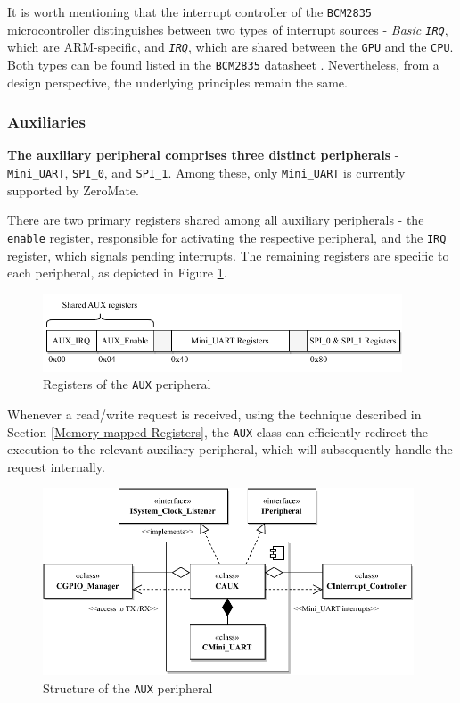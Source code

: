 \documentclass[english, ing, kiv, he, iso690numb, pdf]{fasthesis}
\begin{document}
	It is worth mentioning that the interrupt controller of the \texttt{BCM2835} microcontroller distinguishes between two types of interrupt sources - \textit{Basic \texttt{IRQ}}, which are ARM-specific, and \textit{\texttt{IRQ}}, which are shared between the \texttt{GPU} and the \texttt{CPU}. Both types can be found listed in the \texttt{BCM2835} datasheet \cite{BCM2835}. Nevertheless, from a design perspective, the underlying principles remain the same.
	
	\subsubsection{Auxiliaries} \label{AUX}
	
	\textbf{The auxiliary peripheral comprises three distinct peripherals} - \texttt{Mini\_UART}, \texttt{SPI\_0}, and \texttt{SPI\_1}. Among these, only \texttt{Mini\_UART} is currently supported by ZeroMate.
	
	There are two primary registers shared among all auxiliary peripherals - the \texttt{enable} register, responsible for activating the respective peripheral, and the \texttt{IRQ} register, which signals pending interrupts. The remaining registers are specific to each peripheral, as depicted in Figure \ref{Registers of the AUX peripheral}.
	
	\begin{figure}[ht]
		\centering
		\includegraphics[width=0.95\textwidth]{img/diagrams/aux_reg.pdf}
		\caption{Registers of the \texttt{AUX} peripheral}
		\label{Registers of the AUX peripheral}
	\end{figure}
	
	Whenever a read/write request is received, using the technique described in Section \ref{Memory-mapped Registers}, the \texttt{AUX} class can efficiently redirect the execution to the relevant auxiliary peripheral, which will subsequently handle the request internally.
	
	\newpage
	
	\begin{figure}[ht]
		\centering
		\includegraphics[width=0.98\textwidth]{img/diagrams/aux_peripheral.pdf}
		\caption{Structure of the \texttt{AUX} peripheral}
		\label{Structure of the AUX peripheral}
	\end{figure}
	
\end{document}
